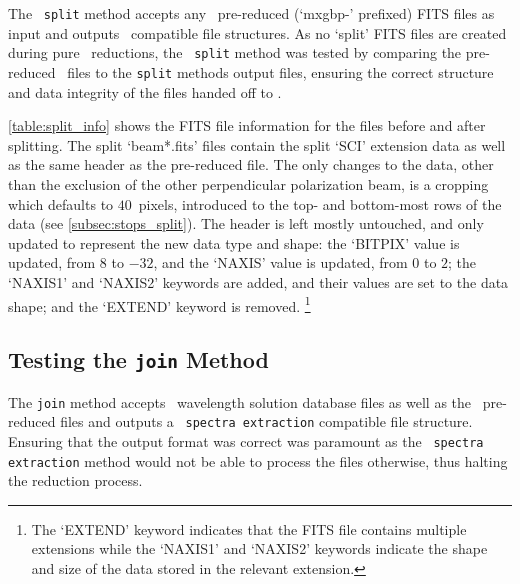 The \stops\ \texttt{split} method accepts any \polsalt\ pre-reduced (`mxgbp-' prefixed) \gls{FITS} files as input and outputs \iraf\ compatible file structures. As no `split' \gls{FITS} files are created during pure \polsalt\ reductions, the \stops\ \texttt{split} method was tested by comparing the pre-reduced \polsalt\ files to the \texttt{split} methods output files, ensuring the correct structure and data integrity of the files handed off to \iraf.



\autoref{table:split_info} shows the \gls{FITS} file information for the files before and after splitting. The split `beam*.fits' files contain the split `SCI' extension data as well as the same header as the pre-reduced file. The only changes to the data, other than the exclusion of the other perpendicular polarization beam, is a cropping which defaults to $40$~pixels, introduced to the top- and bottom-most rows of the data (see \autoref{subsec:stops_split}). The header is left mostly untouched, and only updated to represent the new data type and shape:
the `BITPIX' value is updated, from $8$ to $-32$, and the `NAXIS' value is updated, from $0$ to $2$;
the `NAXIS1' and `NAXIS2' keywords are added, and their values are set to the data shape;
and the `EXTEND' keyword is removed.%
\footnote{The `EXTEND' keyword indicates that the \gls{FITS} file contains multiple extensions while the `NAXIS1' and `NAXIS2' keywords indicate the shape and size of the data stored in the relevant extension.}



\subsection{Testing the \texttt{join} Method} \label{subsec:test_join}

The \texttt{join} method accepts \iraf\ wavelength solution database files as well as the \polsalt\ pre-reduced files and outputs a \polsalt\ \texttt{spectra extraction} compatible file structure. Ensuring that the output format was correct was paramount as the \polsalt\ \texttt{spectra extraction} method would not be able to process the files otherwise, thus halting the reduction process.

